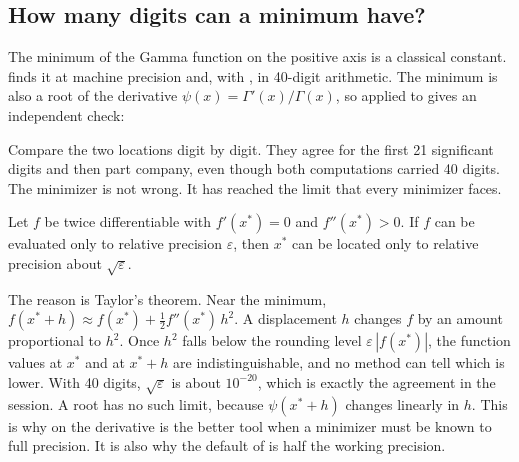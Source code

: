 \subsection{How many digits can a minimum have?}

The minimum of the Gamma function on the positive axis is a classical
constant.  finds it at machine precision and, with
, in 40-digit arithmetic. The minimum is also a root of
the derivative \(\psi(x) = \Gamma'(x)/\Gamma(x)\), so  applied to
 gives an independent check:

\begin{codepairs}
\end{codepairs}

Compare the two locations digit by digit. They agree for the first 21
significant digits and then part company, even though both computations
carried 40 digits. The minimizer is not wrong. It has reached the limit that
every minimizer faces.

\begin{theorem}
Let \(f\) be twice differentiable with \(f'(x^*) = 0\) and \(f''(x^*) > 0\).
If \(f\) can be evaluated only to relative precision \(\varepsilon\), then
\(x^*\) can be located only to relative precision about
\(\sqrt{\varepsilon}\).
\end{theorem}

The reason is Taylor's theorem. Near the minimum,
\(f(x^* + h) \approx f(x^*) + \tfrac12 f''(x^*)\,h^2\). A displacement \(h\)
changes \(f\) by an amount proportional to \(h^2\). Once \(h^2\) falls below the
rounding level \(\varepsilon\,|f(x^*)|\), the function values at \(x^*\) and at
\(x^* + h\) are indistinguishable, and no method can tell which is lower. With
40 digits, \(\sqrt{\varepsilon}\) is about \(10^{-20}\), which is exactly the
agreement in the session. A root has no such limit, because \(\psi(x^* + h)\)
changes linearly in \(h\). This is why  on the derivative is the
better tool when a minimizer must be known to full precision. It is also why
the default  of  is half the working precision.



